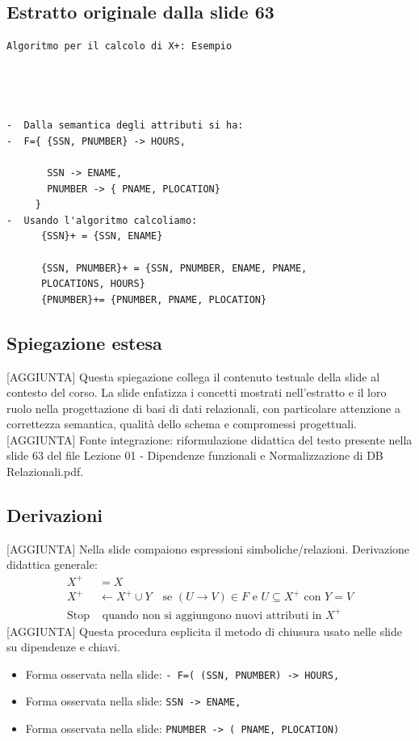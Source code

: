 \documentclass[11pt]{article}
\begin{document}
\subsection*{Estratto originale dalla slide 63}
\begin{lstlisting}
Algoritmo per il calcolo di X+: Esempio




-  Dalla semantica degli attributi si ha:
-  F={ {SSN, PNUMBER} -> HOURS,

       SSN -> ENAME,
       PNUMBER -> { PNAME, PLOCATION}
     }
-  Usando l'algoritmo calcoliamo:
      {SSN}+ = {SSN, ENAME}

      {SSN, PNUMBER}+ = {SSN, PNUMBER, ENAME, PNAME,
      PLOCATIONS, HOURS}
      {PNUMBER}+= {PNUMBER, PNAME, PLOCATION}
\end{lstlisting}
\subsection*{Spiegazione estesa}
[AGGIUNTA] Questa spiegazione collega il contenuto testuale della slide al contesto del corso. La slide enfatizza i concetti mostrati nell'estratto e il loro ruolo nella progettazione di basi di dati relazionali, con particolare attenzione a correttezza semantica, qualità dello schema e compromessi progettuali.
[AGGIUNTA] Fonte integrazione: riformulazione didattica del testo presente nella slide 63 del file Lezione 01 - Dipendenze funzionali e Normalizzazione di DB Relazionali.pdf.
\subsection*{Derivazioni}
[AGGIUNTA] Nella slide compaiono espressioni simboliche/relazioni. Derivazione didattica generale:
\begin{align*}
X^+ &= X \\
X^+ &\leftarrow X^+ \cup Y \quad \text{se } (U \to V) \in F \text{ e } U \subseteq X^+ \text{ con } Y=V \\
\text{Stop} &\text{ quando non si aggiungono nuovi attributi in } X^+
\end{align*}
[AGGIUNTA] Questa procedura esplicita il metodo di chiusura usato nelle slide su dipendenze e chiavi.
\begin{itemize}[leftmargin=*]
\item Forma osservata nella slide: \texttt{-  F=( (SSN, PNUMBER) -> HOURS,}
\item Forma osservata nella slide: \texttt{SSN -> ENAME,}
\item Forma osservata nella slide: \texttt{PNUMBER -> ( PNAME, PLOCATION)}
\end{itemize}
\end{document}
